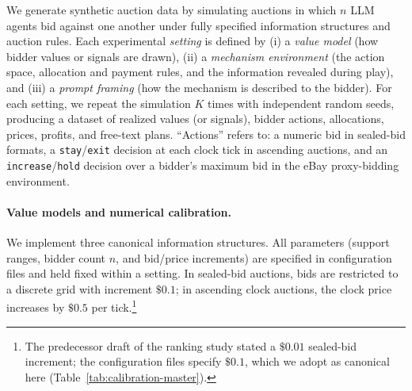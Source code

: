 We generate synthetic auction data by simulating auctions in which $n$ LLM
agents bid against one another under fully specified information structures and
auction rules. Each experimental \emph{setting} is defined by (i) a \emph{value
model} (how bidder values or signals are drawn), (ii) a \emph{mechanism
environment} (the action space, allocation and payment rules, and the
information revealed during play), and (iii) a \emph{prompt framing} (how the
mechanism is described to the bidder). For each setting, we repeat the
simulation $K$ times with independent random seeds, producing a dataset of
realized values (or signals), bidder actions, allocations, prices, profits, and
free-text plans. ``Actions'' refers to: a numeric bid in sealed-bid formats, a
\texttt{stay}/\texttt{exit} decision at each clock tick in ascending auctions,
and an \texttt{increase}/\texttt{hold} decision over a bidder's maximum bid in
the eBay proxy-bidding environment.

\paragraph{Value models and numerical calibration.}
We implement three canonical information structures. All parameters (support
ranges, bidder count $n$, and bid/price increments) are specified in
configuration files and held fixed within a setting. In sealed-bid auctions,
bids are restricted to a discrete grid with increment $\$0.1$; in ascending
clock auctions, the clock price increases by $\$0.5$ per
tick.\footnote{The predecessor draft of the ranking study stated a $\$0.01$
sealed-bid increment; the configuration files specify $\$0.1$, which we adopt
as canonical here (Table~\ref{tab:calibration-master}).}

